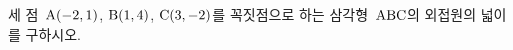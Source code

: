 세 점~$\mathrm{A}(-2{,}\mkern3mu\mathopen{}1)$, $\mathrm{B}(1{,}\mkern3mu\mathopen{}4)$, $\mathrm{C}(3{,}\mkern3mu\mathopen{}-2)$를 꼭짓점으로 하는 삼각형~$\mathrm{ABC}$의 외접원의 넓이를 구하시오.
